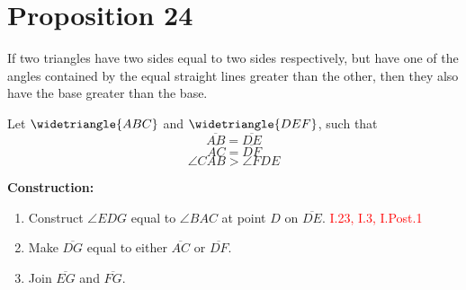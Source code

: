
\section*{Proposition 24}

\renewcommand\qedsymbol{Q.E.F}

\begin{thm}
If two triangles have two sides equal to two sides respectively, but have one of the angles contained by the equal straight lines greater than the other, then they also have the base greater than the base.
\end{thm}



Let $\widetriangle{ABC}$ and $\widetriangle{DEF}$, such that 
\[\overline{AB} = \overline{DE}\]
\[ \overline{AC} = \overline{DF}\]
 \[ \angle{CAB} > \angle{FDE}\]

\begin{figure}[h]
\centering
	\begin{subfigure}{0.4\textwidth}
		\caption{}
	\end{subfigure}
	\begin{subfigure}{0.4\textwidth}
		\caption{}
	\end{subfigure}
	\caption{}
\end{figure}

\textbf{Construction:}
\begin{enumerate}
    \item Construct $\angle{EDG}$ equal to $\angle{BAC}$ at point $D$ on $\overline{DE}$. \hfill\textcolor{red}{I.23, I.3, I.Post.1}
   
    \item Make $\overline{DG}$ equal to either $\overline{AC}$ or $\overline{DF}$.
   
    \item Join $\overline{EG}$ and $\overline{FG}$.
\end{enumerate}

\clearpage

\begin{figure}[H]
	\caption{}
\end{figure}

